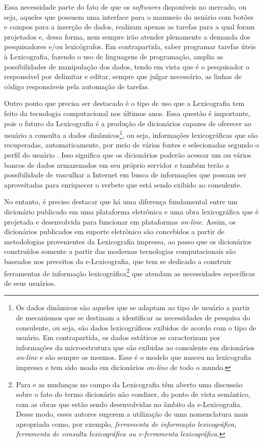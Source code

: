 \documentclass[portuguese]{textolivre}
\begin{document}
Essa necessidade parte do fato de que os \emph{softwares} disponíveis no mercado, ou seja, aqueles que possuem uma interface para o manuseio do usuário com botões e campos para a inserção de dados, realizam apenas as tarefas para a qual foram projetados e, dessa forma, nem sempre irão atender plenamente a demanda dos pesquisadores e/ou lexicógrafos. Em contrapartida, saber programar tarefas úteis à Lexicografia, fazendo o uso de linguagens de programação, amplia as possibilidades de manipulação dos dados, tendo em vista que é o pesquisador o responsável por delimitar e editar, sempre que julgar necessário, as linhas de código responsáveis pela automação de tarefas.

Outro ponto que precisa ser destacado é o tipo de uso que a Lexicografia tem feito da tecnologia computacional nos últimos anos. Essa questão é importante, pois o futuro da Lexicografia é a produção de dicionários capazes de oferecer ao usuário a consulta a dados dinâmicos\footnote{Os dados dinâmicos são aqueles que se adaptam ao tipo de usuário a partir de mecanismos que se destinam a identificar as necessidades de pesquisa do consulente, ou seja, são dados lexicográficos exibidos de acordo com o tipo de usuário. Em contrapartida, os dados estáticos se caracterizam por informações da microestrutura que são exibidas ao consulente em dicionários \textit{on-line} e são sempre os mesmos. Esse é o modelo que nasceu na lexicografia impressa e tem sido usado em dicionários \textit{on-line} de todo o mundo.}, ou seja, informações lexicográficas que são recuperadas, automaticamente, por meio de várias fontes e selecionadas segundo o perfil do usuário \cite[p. 63]{tarp2011}. Isso significa que os dicionários poderão acessar um ou vários bancos de dados armazenados em seu próprio servidor e também terão a possibilidade de vasculhar a Internet em busca de informações que possam ser aproveitadas para enriquecer o verbete que está sendo exibido ao consulente.

No entanto, é preciso destacar que há uma diferença fundamental entre um dicionário publicado em uma plataforma eletrônica e uma obra lexicográfica que é projetada e desenvolvida para funcionar em plataformas \textit{on-line}. Assim, os dicionários publicados em suporte eletrônico são concebidos a partir de metodologias provenientes da Lexicografia impressa, ao passo que os dicionários construídos somente a partir das modernas tecnologias computacionais são baseados nos preceitos da e-Lexicografia, que tem se dedicado a construir ferramentas de informação lexicográfica\footnote{Para \textcite[p. 2]{fuertes2011} e \textcite[p. 69]{tarp2011} as mudanças no campo da Lexicografia têm aberto uma discussão sobre o fato do termo dicionário não condizer, do ponto de vista semântico, com as obras que estão sendo desenvolvidas no âmbito da e-Lexicografia. Desse modo, esses autores sugerem a utilização de uma nomenclatura mais apropriada como, por exemplo, \emph{ferramenta de informação lexicográfica, ferramenta de consulta lexicográfica ou e-ferramenta lexicográfica.}} que atendam as necessidades específicas de seus usuários.
\end{document}
